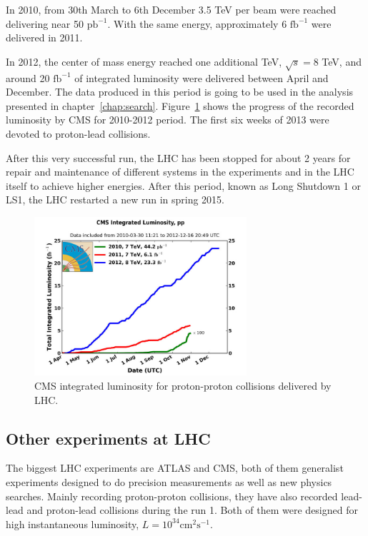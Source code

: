 In 2010, from 30th March to 6th December 3.5 TeV per beam were reached delivering near 50 $\text{pb}^{-1}$. With the same energy, approximately 6 $\text{fb}^{-1}$ were delivered in 2011. 

In 2012, the center of mass energy reached one additional TeV, $\sqrt{s}=8$ TeV, and around 20 $\text{fb}^{-1}$ of integrated luminosity were delivered between April and December. The data produced in this period is going to be used in the analysis presented in chapter~\ref{chap:search}. Figure~\ref{fig:CMSlumi} shows the progress of the recorded luminosity by CMS for 2010-2012 period. The first six weeks of 2013 were devoted to proton-lead collisions.

After this very successful run, the LHC has been stopped for about 2 years for repair and maintenance of different systems in the experiments and in the LHC itself to achieve higher energies. After this period, known as Long Shutdown 1 or LS1, the LHC restarted a new run in spring 2015.

\begin{figure}[!Hhtbp]
  \begin{center}
    \includegraphics[width=0.7\textwidth]{figs/cms-int-10to12.jpg}
    \caption{CMS integrated luminosity for proton-proton collisions delivered by LHC. }
    \label{fig:CMSlumi}
  \end{center}
\end{figure}

\subsection{Other experiments at LHC}
\label{sec:expers}

The biggest LHC experiments are ATLAS and CMS, both of them generalist experiments designed to do precision measurements as well as new physics searches. Mainly recording proton-proton collisions, they have also recorded lead-lead and proton-lead collisions during the run 1. Both of them were designed for high instantaneous luminosity, $L = 10^{34}\text{cm}^{2}\text{s}^{-1}$.

